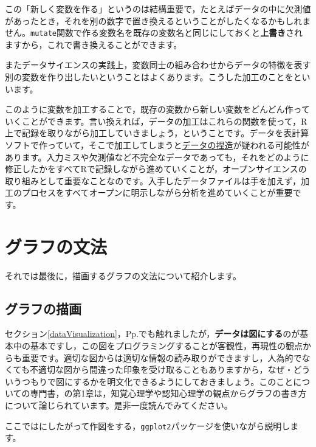\documentclass{ltjsbook}
\begin{document}
この「新しく変数を作る」というのは結構重要で，たとえばデータの中に欠測値があったとき，それを別の数字で置き換えるということがしたくなるかもしれません。\verb|mutate|関数で作る変数名を既存の変数名と同じにしておくと\textbf{上書き}されますから，これで書き換えることができます。

またデータサイエンスの実践上，変数同士の組み合わせからデータの特徴を表す別の変数を作り出したいということはよくあります。こうした加工のことをといいます。

このように変数を加工することで，既存の変数から新しい変数をどんどん作っていくことができます。言い換えれば，データの加工はこれらの関数を使って，R上で記録を取りながら加工していきましょう，ということです。データを表計算ソフトで作っていて，そこで加工してしまうと\underline{データの捏造}が疑われる可能性があります。入力ミスや欠測値など不完全なデータであっても，それをどのように修正したかをすべてRで記録しながら進めていくことが，オープンサイエンスの取り組みとして重要なことなのです。入手したデータファイルは手を加えず，加工のプロセスをすべてオープンに明示しながら分析を進めていくことが重要です。

\section{グラフの文法}
それでは最後に，描画するグラフの文法について紹介します。

\subsection{グラフの描画}
セクション\ref{dataVisualization}，Pp.\pageref{dataVisualization}でも触れましたが，\textbf{データは図にする}のが基本中の基本ですし，この図をプログラミングすることが客観性，再現性の観点からも重要です。適切な図からは適切な情報の読み取りができますし，人為的でなくても不適切な図から間違った印象を受け取ることもありますから，なぜ・どういうつもりで図にするかを明文化できるようにしておきましょう。このことについての専門書，\textcite{Kieran2018}の第1章は，知覚心理学や認知心理学の観点からグラフの書き方について論じられています。是非一度読んでみてください。

ここではにしたがって作図をする，\texttt{ggplot2}パッケージ\parencite{ggplot2}を使いながら説明します。
\end{document}

